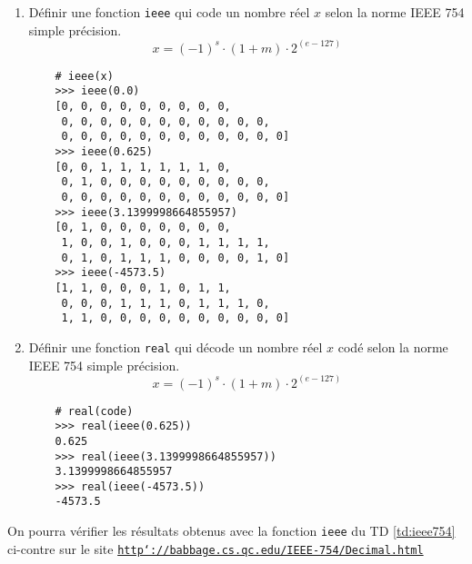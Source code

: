 \begin{td}\label{td:ieee754}
\em

\begin{enumerate}
\item Définir une fonction {\tt ieee} qui code
	un nombre réel $x$ selon la norme IEEE 754 simple précision.
	$$x = (-1)^s\cdot (1+m)\cdot 2^{(e-127)}$$

	\begin{py}{7cm}
	\begin{verbatim}
	# ieee(x)
	>>> ieee(0.0)
	[0, 0, 0, 0, 0, 0, 0, 0, 0, 
	 0, 0, 0, 0, 0, 0, 0, 0, 0, 0, 0, 
	 0, 0, 0, 0, 0, 0, 0, 0, 0, 0, 0, 0]
	>>> ieee(0.625)
	[0, 0, 1, 1, 1, 1, 1, 1, 0, 
	 0, 1, 0, 0, 0, 0, 0, 0, 0, 0, 0, 
	 0, 0, 0, 0, 0, 0, 0, 0, 0, 0, 0, 0]
	>>> ieee(3.1399998664855957)
	[0, 1, 0, 0, 0, 0, 0, 0, 0, 
	 1, 0, 0, 1, 0, 0, 0, 1, 1, 1, 1, 
	 0, 1, 0, 1, 1, 1, 0, 0, 0, 0, 1, 0]
	>>> ieee(-4573.5)
	[1, 1, 0, 0, 0, 1, 0, 1, 1, 
	 0, 0, 0, 1, 1, 1, 0, 1, 1, 1, 0, 
	 1, 1, 0, 0, 0, 0, 0, 0, 0, 0, 0, 0]
	\end{verbatim}
	\end{py}

\item Définir une fonction {\tt real} qui décode un nombre réel $x$ 
	codé selon la norme IEEE 754 simple précision.
	$$x = (-1)^s\cdot (1+m)\cdot 2^{(e-127)}$$

	\begin{py}{7cm}
	\begin{verbatim}
	# real(code)
	>>> real(ieee(0.625))
	0.625
	>>> real(ieee(3.1399998664855957))
	3.1399998664855957
	>>> real(ieee(-4573.5))
	-4573.5
	\end{verbatim}
	\end{py}
\end{enumerate}

\noindent On pourra vérifier les résultats obtenus avec la fonction {\tt ieee}
du TD \ref{td:ieee754} ci-contre sur le site 
\href{http://babbage.cs.qc.edu/IEEE-754/Decimal.html}{\tt http\char`://babbage.cs.qc.edu/IEEE-754/Decimal.html}

\end{td}

